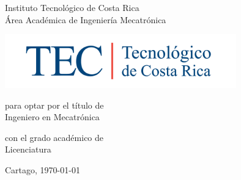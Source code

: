 
\thispagestyle{empty} 

\begin{center}


Instituto Tecnológico de Costa Rica \\
Área Académica de Ingeniería Mecatrónica

\vspace{10pt}



\par\vspace{25mm}

\includegraphics[width=100mm]{fig/MarcaTECRGB.png}

\par\vspace*{\fill}

{\large\bf{\scriptTitle}}

\par\vspace*{\fill}

para optar por el título de \\
{\sf Ingeniero en Mecatrónica} \\

\vspace{8pt}

con el grado acad\'emico de \\
{\sf Licenciatura} \\

\par\vspace{25mm}

\scriptAuthor

\vspace*{\fill}

{Cartago, \today}

\end{center}
\newpage 
\cleardoublepage 


